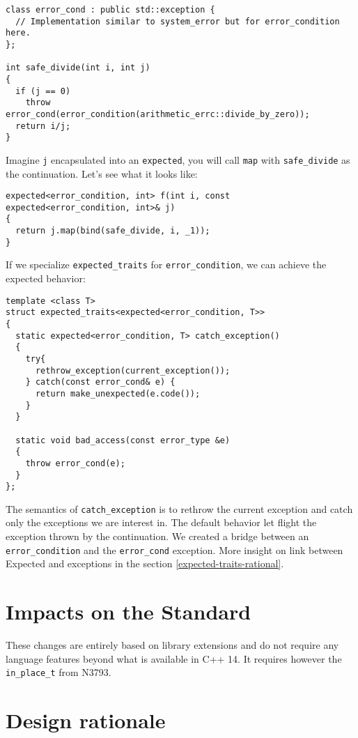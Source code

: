\documentclass[a4paper,10pt]{article}
\newcommand{\cpp}[1]{\lstinline{#1}}
\begin{document}
\begin{lstlisting}
class error_cond : public std::exception {
  // Implementation similar to system_error but for error_condition here.
};

int safe_divide(int i, int j)
{
  if (j == 0) 
    throw error_cond(error_condition(arithmetic_errc::divide_by_zero));
  return i/j;
}
\end{lstlisting}

Imagine \cpp{j} encapsulated into an \cpp{expected}, you will call \cpp{map} with \cpp{safe_divide} as the continuation. Let's see what it looks like:

\begin{lstlisting}
expected<error_condition, int> f(int i, const expected<error_condition, int>& j)
{
  return j.map(bind(safe_divide, i, _1));
}
\end{lstlisting}

If we specialize \cpp{expected_traits} for \cpp{error_condition}, we can achieve the expected behavior:

\begin{lstlisting}
template <class T>
struct expected_traits<expected<error_condition, T>>
{
  static expected<error_condition, T> catch_exception()
  {
    try{
      rethrow_exception(current_exception());
    } catch(const error_cond& e) {
      return make_unexpected(e.code());
    }
  }

  static void bad_access(const error_type &e)
  {
    throw error_cond(e);
  }
};
\end{lstlisting}

The semantics of \cpp{catch_exception} is to rethrow the current exception and catch only the exceptions we are interest in. The default behavior let flight the exception thrown by the continuation. We created a bridge between an \cpp{error_condition} and the \cpp{error_cond} exception. More insight on link between Expected and exceptions in the section \ref{expected-traits-rational}.

\section{Impacts on the Standard}

These changes are entirely based on library extensions and do not require any language features beyond what is available in C++ 14. It requires however the \cpp{in_place_t} from N3793.

\section{Design rationale}
\end{document}
